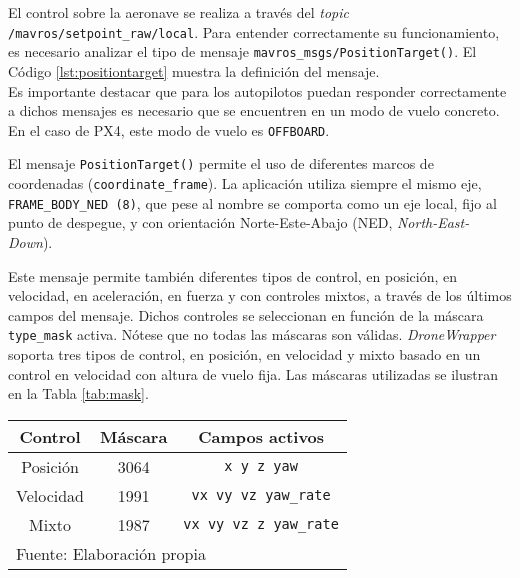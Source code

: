 \documentclass[../main.tex]{subfiles}
\begin{document}
\begin{figure}[!ht]
 	{}
\end{figure}
\clearpage

El control sobre la aeronave se realiza a través del \emph{topic} \lstinline{/mavros/setpoint_raw/local}. Para entender correctamente su funcionamiento, es necesario analizar el tipo de mensaje \lstinline{mavros_msgs/PositionTarget()}. El Código \ref{lst:positiontarget} muestra la definición del mensaje. \\
Es importante destacar que para los autopilotos puedan responder correctamente a dichos mensajes es necesario que se encuentren en un modo de vuelo concreto. En el caso de PX4, este modo de vuelo es \lstinline{OFFBOARD}.



El mensaje \lstinline{PositionTarget()} permite el uso de diferentes marcos de coordenadas (\lstinline{coordinate_frame}). La aplicación utiliza siempre el mismo eje, \lstinline{FRAME_BODY_NED (8)}, que pese al nombre se comporta como un eje local, fijo al punto de despegue, y con orientación Norte-Este-Abajo (NED, \emph{North-East-Down}).

Este mensaje permite también diferentes tipos de control, en posición, en velocidad, en aceleración, en fuerza y con controles mixtos, a través de los últimos campos del mensaje. Dichos controles se seleccionan en función de la máscara \lstinline{type_mask} activa. Nótese que no todas las máscaras son válidas.
\emph{DroneWrapper} soporta tres tipos de control, en posición, en velocidad y mixto basado en un control en velocidad con altura de vuelo fija. Las máscaras utilizadas se ilustran en la Tabla \ref{tab:mask}.

\begin{table}[H]
	{\begin{tabular}{|c|c|c|}
		\hline
		\textbf{Control} & \textbf{Máscara} & \textbf{Campos activos} \\
		\hline
		Posición & 3064 & \lstinline{x y z yaw}  \\
		\hline
        Velocidad & 1991 & \lstinline{vx vy vz yaw_rate} \\
        \hline
        Mixto & 1987 & \lstinline{vx vy vz z yaw_rate} \\
        \hline
		\multicolumn{3}{l}{Fuente: Elaboración propia}
	\end{tabular}}
\end{table}
\end{document}
